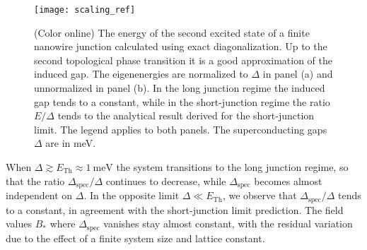 \documentclass[twocolumn, notitlepage, 10pt, aps, floatfix, showpacs, prb, citeautoscript]{revtex4-1}
\begin{document}
\begin{figure}[h]
\texttt{[image: scaling\_ref]}
\caption{(Color online) The energy of the second excited state of a finite nanowire junction calculated using exact diagonalization.
Up to the second topological phase transition it is a good approximation of the induced gap.
The eigenenergies are normalized to $\Delta$ in panel (a) and unnormalized in panel (b).
In the long junction regime the induced gap tends to a constant, while in the short-junction regime the ratio $E/\Delta$ tends to the analytical result derived for the short-junction limit.
The legend applies to both panels.
The superconducting gaps $\Delta$ are in meV.}
\label{fig:scaling_delta}
\end{figure}

When $\Delta \gtrsim E_\mathrm{Th}\approx \SI{1}{\meV}$ the system transitions to the long junction regime, so that the ratio $\Delta_\textrm{spec}/\Delta$ continues to decrease, while $\Delta_\text{spec}$ becomes almost independent on $\Delta$.
In the opposite limit $\Delta \ll E_\mathrm{Th}$, we observe that $\Delta_\textrm{spec}/\Delta$ tends to a constant, in agreement with the short-junction limit prediction.
The field values $B_*$ where $\Delta_\textrm{spec}$ vanishes stay almost constant, with the residual variation due to the effect of a finite system size and lattice constant.



\end{document}
